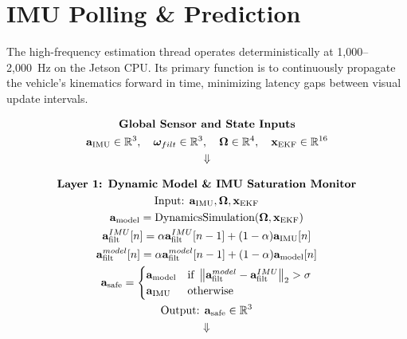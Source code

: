 \documentclass{article}
\begin{document}

\section{IMU Polling \& Prediction}
The high-frequency estimation thread operates deterministically at 1,000--2,000~Hz on the Jetson CPU. Its primary function is to continuously propagate the vehicle's kinematics forward in time, minimizing latency gaps between visual update intervals.

\begin{tcolorbox}[colback=gray!5, colframe=black, arc=2mm, title=\textbf{High-Frequency IMU \& Prediction Thread ($T_2$) Architecture Stack}, center title]
\vspace{-0.5em}
$$
\begin{gathered}
    \text{\textbf{Global Sensor and State Inputs}} \\
    \mathbf{a}_{\text{IMU}} \in \mathbb{R}^3, \quad \boldsymbol{\omega}_{filt} \in \mathbb{R}^3, \quad \boldsymbol{\Omega} \in \mathbb{R}^4, \quad \mathbf{x}_{\text{EKF}} \in \mathbb{R}^{16} \\
    \Downarrow
\end{gathered}
$$

$$
\begin{gathered}
    \text{\textbf{Layer 1: Dynamic Model \& IMU Saturation Monitor}} \\
    \text{Input: } \mathbf{a}_{\text{IMU}}, \boldsymbol{\Omega}, \mathbf{x}_{\text{EKF}} \\
    \mathbf{a}_{\text{model}} = \text{DynamicsSimulation}(\boldsymbol{\Omega}, \mathbf{x}_{\text{EKF}}) \\
    \mathbf{a}_{\text{filt}}^{IMU}[n] = \alpha \mathbf{a}_{\text{filt}}^{IMU}[n-1] + (1 - \alpha) \mathbf{a}_{\text{IMU}}[n] \\
    \mathbf{a}_{\text{filt}}^{model}[n] = \alpha \mathbf{a}_{\text{filt}}^{model}[n-1] + (1 - \alpha) \mathbf{a}_{\text{model}}[n] \\
    \mathbf{a}_{\text{safe}} = \begin{cases} \mathbf{a}_{\text{model}} & \text{if } \left\| \mathbf{a}_{\text{filt}}^{model} - \mathbf{a}_{\text{filt}}^{IMU} \right\|_2 > \sigma \\ \mathbf{a}_{\text{IMU}} & \text{otherwise} \end{cases} \\
    \text{Output: } \mathbf{a}_{\text{safe}} \in \mathbb{R}^3 \\
    \Downarrow
\end{gathered}
$$


\end{tcolorbox}
\end{document}
